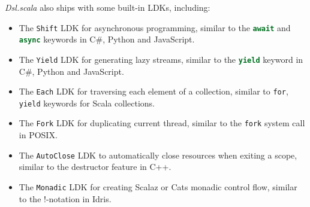 \textit{Dsl.scala} also ships with some built-in LDKs, including:
\begin{itemize}
  \item The \lstinline{Shift} LDK for asynchronous programming, similar to the \lstinline[language=Python]{await} and \lstinline[language=Python]{async} keywords in C\#, Python and JavaScript.
  \item The \lstinline{Yield} LDK for generating lazy streams, similar to the \lstinline[language=Python]{yield} keyword in C\#, Python and JavaScript.
  \item The \lstinline{Each} LDK for traversing each element of a collection, similar to \lstinline{for}, \lstinline{yield} keywords for Scala collections.
  \item The \lstinline{Fork} LDK for duplicating current thread, similar to the \lstinline{fork} system call in POSIX.
  \item The \lstinline{AutoClose} LDK to automatically close resources when exiting a scope, similar to the destructor feature in C++.
  \item The \lstinline{Monadic} LDK for creating Scalaz \cite{kenji2017scalaz} or Cats \cite{typelevel2017cats} monadic control flow, similar to the !-notation in Idris\cite{brady2013idris}.
\end{itemize}
 






